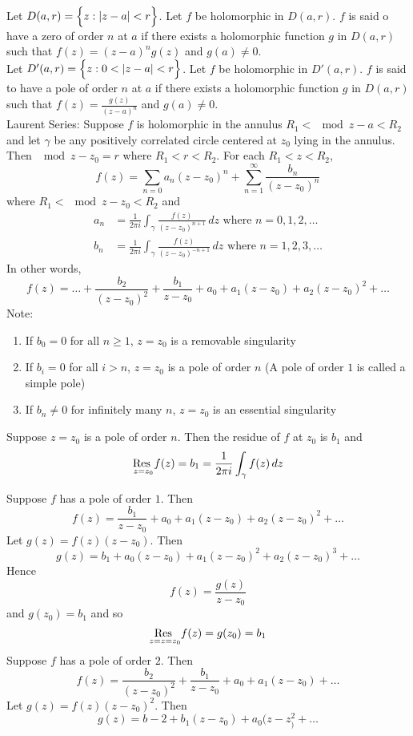 \documentclass[12pt]{article}
\begin{document}
Let $D(a,r) = \Big\{ z : \abs{z-a} < r \Big\}$. Let $f$ be holomorphic in $D(a,r)$. $f$ is said o have a zero of order $n$ at $a$ if there exists a holomorphic function $g$ in $D(a,r)$ such that $f(z) = (z-a)^ng(z)$ and $g(a) \neq 0$. \\
Let $D'(a,r) = \Big\{ z: 0 < \abs{z-a} < r \Big\}$. Let $f$ be holomorphic in $D'(a,r)$. $f$ is said to have a pole of order $n$ at $a$ if there exists a holomorphic function $g$ in $D(a,r)$ such that $f(z) = \frac{g(z)}{(z-a)^n}$ and $g(a) \neq 0$. \\
Laurent Series: Suppose $f$ is holomorphic in the annulus $R_1 < \mod{z-a} < R_2$ and let $\gamma $ be any positively correlated circle centered at $z_0$ lying in the annulus. Then $\mod{z-z_0} = r$ where $R_1 < r < R_2$. For each $R_1 < z < R_2$, $$ f(z) = \sum_{n=0} a_n(z-z_0)^n + \sum_{n=1}^\infty \frac{b_n}{(z-z_0)^n} $$ where $R_1 < \mod{z-z_0} < R_2$ and $$ \begin{aligned} a_n &= \frac{1}{2\pi i} \int_\gamma \frac{f(z)}{(z-z_0)^{n+1}} \, dz \text{ where } n = 0,1,2,\dots \\ b_n &= \frac{1}{2\pi i} \int_\gamma \frac{f(z)}{(z-z_0)^{-n+1}} \, dz \text{ where } n = 1,2,3,\dots \end{aligned} $$ 
In other words, $$ f(z) = \dots + \frac{b_2}{(z-z_0)^2} + \frac{b_1}{z-z_0} + a_0 + a_1(z-z_0) + a_2(z-z_0)^2 + \dots $$ Note: \begin{enumerate} 
\item If $b_0 = 0$ for all $n\geq1$, $z=z_0$ is a removable singularity 
\item If $b_i = 0$ for all $i > n$, $z=z_0$ is a pole of order $n$ (A pole of order $1$ is called a simple pole)
\item If $b_n \neq 0$ for infinitely many $n$, $z=z_0$ is an essential singularity \end{enumerate} 
\begin{theorem} Suppose $z=z_0$ is a pole of order $n$. Then the residue of $f$ at $z_0$ is $b_1$ and $$ \underset{z=z_0}{\text{Res }} f(z) = b_1 = \frac{1}{2\pi i} \int_\gamma f(z) \, dz $$ \end{theorem} 
Suppose $f$ has a pole of order $1$. Then $$f(z) = \frac{b_1}{z-z_0} + a_0 + a_1(z-z_0) + a_2(z-z_0)^2 + \dots $$ Let $g(z) = f(z)(z-z_0)$. Then $$g(z) = b_1 + a_0(z-z_0) + a_1(z-z_0)^2 + a_2(z-z_0)^3 + \dots $$ Hence $$f(z) = \frac{g(z)}{z-z_0}$$ and $g(z_0) = b_1$ and so $$ \underset{z=z=z_0}{\text{Res }} f(z) = g(z_0) = b_1 $$ 
Suppose $f$ has a pole of order $2$. Then $$f(z) = \frac{b_2}{(z-z_0)^2} + \frac{b_1}{z-z_0} + a_0 + a_1(z-z_0) + \dots $$ Let $g(z) = f(z)(z-z_0)^2$. Then $$g(z) = b-2 + b_1(z-z_0) + a_0(z-z_)^2 + \dots $$ 
\end{document}
